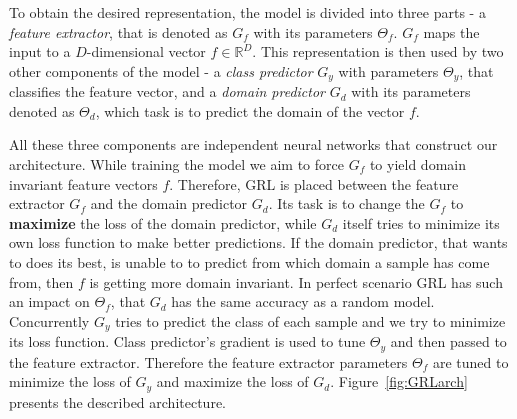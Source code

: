 \documentclass[shortabstract, inz, english]{iithesis}
\begin{document}
\par
To obtain the desired representation, the model is divided into three parts - a \textit{feature extractor}, that is denoted as $G_{f}$ with its parameters $\Theta_{f}$. $G_{f}$ maps the input to a $D$-dimensional vector $f \in \mathbb{R}^{D}$. This representation is then used by two other components of the model - a \textit{class predictor} $G_{y}$ with parameters $\Theta_{y}$, that classifies the feature vector, and a \textit{domain predictor} $G_{d}$ with its parameters denoted as $\Theta_{d}$, which task is to predict the domain of the vector $f$.
\par
All these three components are independent neural networks that construct our architecture. While training the model we aim to force $G_{f}$ to yield domain invariant feature vectors $f$. Therefore, GRL is placed between the feature extractor $G_{f}$ and the domain predictor $G_{d}$. Its task is to change the $G_{f}$ to \textbf{maximize} the loss of the domain predictor, while $G_{d}$ itself tries to minimize its own loss function to make better predictions. If the domain predictor, that wants to does its best, is unable to to predict from which domain a sample has come from, then $f$ is getting more domain invariant. In perfect scenario GRL has such an impact on $\Theta_{f}$, that $G_{d}$ has the same accuracy as a random model. Concurrently $G_{y}$ tries to predict the class of each sample and we try to minimize its loss function. Class predictor's gradient is used to tune $\Theta_{y}$ and then passed to the feature extractor. Therefore the feature extractor parameters $\Theta_{f}$ are tuned to minimize the loss of $G_{y}$ and maximize the loss of $G_{d}$. Figure~\ref{fig:GRLarch} presents the described architecture.
\end{document}
